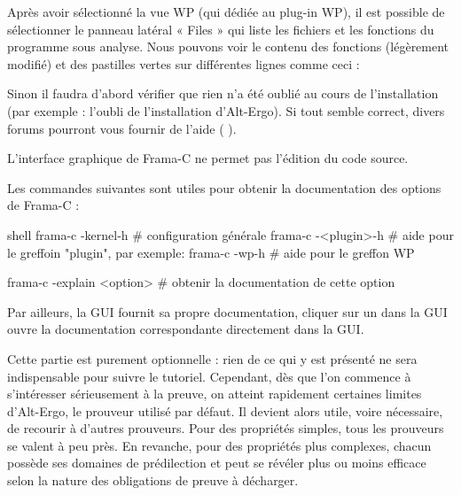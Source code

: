 

Après avoir sélectionné la vue WP (qui dédiée au plug-in WP), il est possible de
sélectionner le panneau latéral « Files » qui liste les fichiers et les fonctions
du programme sous analyse. Nous pouvons voir le contenu des fonctions
(légèrement modifié) et des pastilles vertes sur différentes lignes comme ceci :





Sinon il faudra d'abord vérifier que rien n'a été oublié au cours de
l'installation (par exemple : l'oubli de l'installation d'Alt-Ergo). Si tout
semble correct, divers forums pourront vous fournir de l'aide
(
 ).



\begin{Warning}
L'interface graphique de Frama-C ne permet pas l'édition du code source.
\end{Warning}




Les commandes suivantes sont utiles pour obtenir la documentation des options de
Frama-C :
\begin{CodeBlock}{shell}
frama-c -kernel-h # configuration générale
frama-c -<plugin>-h # aide pour le greffoin "plugin", par exemple:
frama-c -wp-h # aide pour le greffon WP

frama-c -explain <option> # obtenir la documentation de cette option
\end{CodeBlock}


Par ailleurs, la GUI fournit sa propre documentation, cliquer sur un
 dans la GUI ouvre la documentation correspondante directement
dans la GUI.




Cette partie est purement optionnelle : rien de ce qui y est présenté ne sera
indispensable pour suivre le tutoriel. Cependant, dès que l’on commence à
s’intéresser sérieusement à la preuve, on atteint rapidement certaines limites
d’Alt-Ergo, le prouveur utilisé par défaut. Il devient alors utile, voire
nécessaire, de recourir à d’autres prouveurs. Pour des propriétés simples, tous
les prouveurs se valent à peu près. En revanche, pour des propriétés plus
complexes, chacun possède ses domaines de prédilection et peut se révéler plus
ou moins efficace selon la nature des obligations de preuve à décharger.


